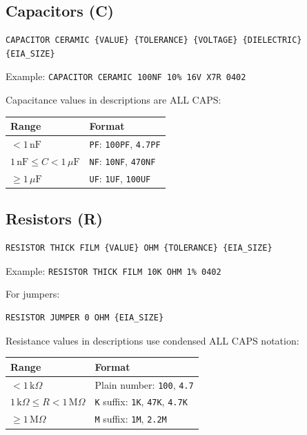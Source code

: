\documentclass[11pt,a4paper]{article}
\begin{document}
\subsection{Capacitors (C)}

\begin{verbatim}
CAPACITOR CERAMIC {VALUE} {TOLERANCE} {VOLTAGE} {DIELECTRIC} {EIA_SIZE}
\end{verbatim}

Example: \texttt{CAPACITOR CERAMIC 100NF 10\% 16V X7R 0402}

Capacitance values in descriptions are ALL CAPS:

\begin{tabular}{@{}ll@{}}
\toprule
Range & Format \\
\midrule
$< 1\,\text{nF}$ & \texttt{PF}: \texttt{100PF}, \texttt{4.7PF} \\
$1\,\text{nF} \leq C < 1\,\mu\text{F}$ & \texttt{NF}: \texttt{10NF}, \texttt{470NF} \\
$\geq 1\,\mu\text{F}$ & \texttt{UF}: \texttt{1UF}, \texttt{100UF} \\
\bottomrule
\end{tabular}

\subsection{Resistors (R)}

\begin{verbatim}
RESISTOR THICK FILM {VALUE} OHM {TOLERANCE} {EIA_SIZE}
\end{verbatim}

Example: \texttt{RESISTOR THICK FILM 10K OHM 1\% 0402}

For jumpers:
\begin{verbatim}
RESISTOR JUMPER 0 OHM {EIA_SIZE}
\end{verbatim}

Resistance values in descriptions use condensed ALL CAPS notation:

\begin{tabular}{@{}ll@{}}
\toprule
Range & Format \\
\midrule
$< 1\,\text{k}\Omega$ & Plain number: \texttt{100}, \texttt{4.7} \\
$1\,\text{k}\Omega \leq R < 1\,\text{M}\Omega$ & \texttt{K} suffix: \texttt{1K}, \texttt{47K}, \texttt{4.7K} \\
$\geq 1\,\text{M}\Omega$ & \texttt{M} suffix: \texttt{1M}, \texttt{2.2M} \\
\bottomrule
\end{tabular}
\end{document}
